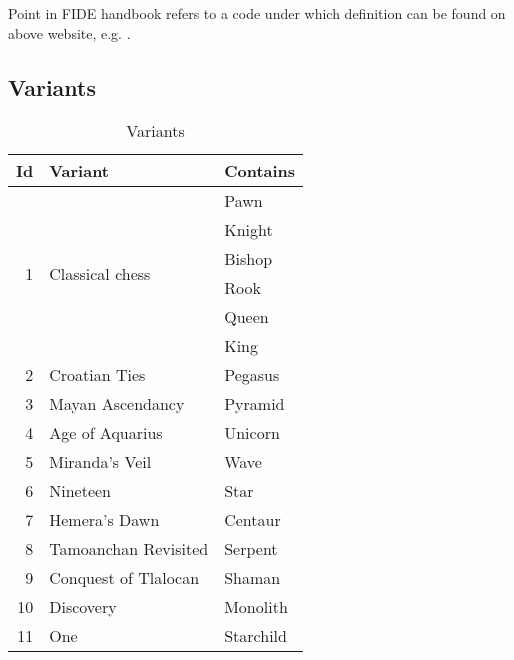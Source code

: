 Point in FIDE handbook refers to a code under which definition can be found on above website,
e.g. .

\clearpage %

\subsection*{Variants}
\label{sec:Appendix/Introduction/Variants}

\begin{table}[!h]
\centering
\begin{tabular}{ rll }
\toprule
\textbf{Id} & \textbf{Variant} & \textbf{Contains}                  \\
\midrule
\multirow{6}{*}{1} & \multirow{6}{*}{Classical chess} & Pawn        \\
                   &                                  & Knight      \\
                   &                                  & Bishop      \\
                   &                                  & Rook        \\
                   &                                  & Queen       \\
                   &                                  & King        \\ \cmidrule{1-3}
                 2 & Croatian Ties                    & Pegasus     \\
                 3 & Mayan Ascendancy                 & Pyramid     \\
                 4 & Age of Aquarius                  & Unicorn     \\
                 5 & Miranda's Veil                   & Wave        \\
                 6 & Nineteen                         & Star        \\
                 7 & Hemera's Dawn                    & Centaur     \\
                 8 & Tamoanchan Revisited             & Serpent     \\
                 9 & Conquest of Tlalocan             & Shaman      \\
                10 & Discovery                        & Monolith    \\
                11 & One                              & Starchild   \\
\bottomrule
\end{tabular}
\caption{Variants}
\label{tbl:Appendix/Introduction/Variants}
\end{table}

